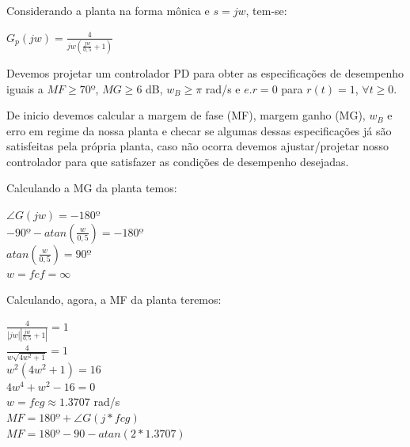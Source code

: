  Considerando a planta na forma mônica e $s=jw$, tem-se:
 
\begin{center}
    $G_p(jw) = \frac{4}{jw(\frac{jw}{0,5}+1)}$
\end{center}

Devemos projetar um controlador PD para obter as especificações de desempenho iguais a $MF\ge70º$, $MG\ge6$ dB, $w_B \ge \pi$ rad/s e $e.r=0$ para $r(t)=1$, $\forall t \ge 0$.

De inicio devemos calcular a margem de fase (MF), margem ganho (MG), $w_B$ e erro em regime da nossa planta e checar se algumas dessas especificações já são satisfeitas pela própria planta, caso não ocorra devemos ajustar/projetar nosso controlador para que satisfazer as condições de desempenho desejadas.

Calculando a MG da planta temos:

\begin{center}
   $ \angle G(jw) = -180º $ \vspace{5pt}\\
    $-90º -atan(\frac{w}{0,5}) =-180º$ \vspace{5pt}\\
    $atan(\frac{w}{0,5}) =90º$ \vspace{5pt}\\
    $w=fcf = \infty$ \vspace{5pt}\\
\end{center}


Calculando, agora, a MF da planta teremos:

\begin{center}
    $\frac{4}{|jw||\frac{jw}{0,5}+1|} = 1$  \vspace{5pt}\\
    $\frac{4}{w \sqrt{4w^2+1}}=1$\vspace{5pt}\\
    $w^2(4w^2+1)=16$\vspace{5pt}\\
    $4w^4 +w^2 -16 =0$\vspace{5pt}\\
    $w=fcg \approx 1.3707$ rad/s \vspace{5pt}\\
    $MF = 180º + \angle G(j*fcg)$ \vspace{5pt} \\
    $MF = 180º - 90 - atan(2*1.3707)$ \vspace{5pt} \\
\end{center}


